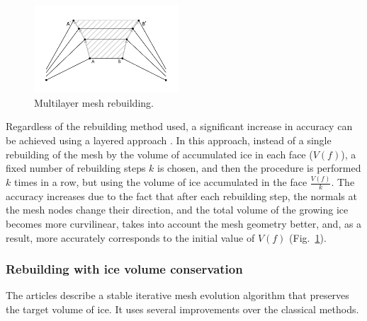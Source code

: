 \begin{figure}[ht]
\centering
\includegraphics[width=0.48\textwidth]{pics/text_1_remesh_3d/pic_classical_methods_multilayer.pdf}
\caption{Multilayer mesh rebuilding.}\label{fig:pic_classical_methods_multilayer}
\end{figure}

Regardless of the rebuilding method used, a significant increase in accuracy can be achieved using a layered approach \cite{BourgaultCote}.
In this approach, instead of a single rebuilding of the mesh by the volume of accumulated ice in each face ($V(f)$), a fixed number of rebuilding steps $k$ is chosen, and then the procedure is performed $k$ times in a row, but using the volume of ice accumulated in the face $\frac{V(f)}{k}$.
The accuracy increases due to the fact that after each rebuilding step, the normals at the mesh nodes change their direction, and the total volume of the growing ice becomes more curvilinear, takes into account the mesh geometry better, and, as a result, more accurately corresponds to the initial value of $V(f)$ (Fig.~\ref{fig:pic_classical_methods_multilayer}).

\subsubsection{Rebuilding with ice volume conservation}

The articles \cite{Thompson,Tong} describe a stable iterative mesh evolution algorithm that preserves the target volume of ice.
It uses several improvements over the classical methods.

